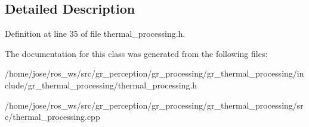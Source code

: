 \subsection{Detailed Description}


Definition at line 35 of file thermal\+\_\+processing.\+h.



The documentation for this class was generated from the following files\+:\begin{DoxyCompactItemize}
\item 
/home/jose/ros\+\_\+ws/src/gr\+\_\+perception/gr\+\_\+processing/gr\+\_\+thermal\+\_\+processing/include/gr\+\_\+thermal\+\_\+processing/thermal\+\_\+processing.\+h\item 
/home/jose/ros\+\_\+ws/src/gr\+\_\+perception/gr\+\_\+processing/gr\+\_\+thermal\+\_\+processing/src/thermal\+\_\+processing.\+cpp\end{DoxyCompactItemize}
